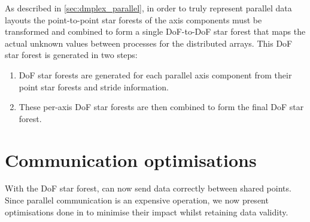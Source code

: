 \documentclass[thesis]{subfiles}
\begin{document}
%
%
%

As described in \cref{sec:dmplex_parallel}, in order to truly represent parallel data layouts the point-to-point star forests of the axis components must be transformed and combined to form a single DoF-to-DoF star forest that maps the actual unknown values between processes for the distributed arrays.
This DoF star forest is generated in two steps:
\begin{enumerate}
  \item
    DoF star forests are generated for each parallel axis component from their point star forests and stride information.
  \item
    These per-axis DoF star forests are then combined to form the final DoF star forest.
\end{enumerate}

\section{Communication optimisations}
\label{sec:communication_optimisations}

With the DoF star forest,   can now send data correctly between shared points.
Since parallel communication is an expensive operation, we now present optimisations done in  to minimise their impact whilst retaining data validity.
\end{document}
